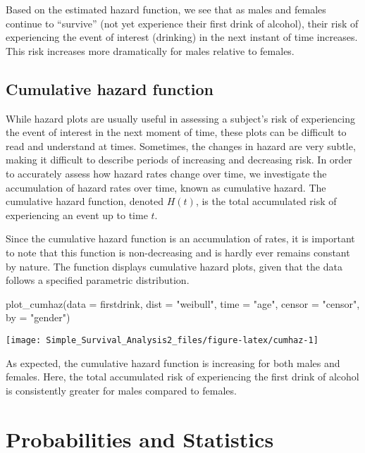 Based on the estimated hazard function, we see that as males and females
continue to ``survive'' (not yet experience their first drink of
alcohol), their risk of experiencing the event of interest (drinking) in
the next instant of time increases.\\
This risk increases more dramatically for males relative to females.

\hypertarget{cumulative-hazard-function}{%
\subsection{Cumulative hazard
function}\label{cumulative-hazard-function}}

While hazard plots are usually useful in assessing a subject's risk of
experiencing the event of interest in the next moment of time, these
plots can be difficult to read and understand at times. Sometimes, the
changes in hazard are very subtle, making it difficult to describe
periods of increasing and decreasing risk. In order to accurately assess
how hazard rates change over time, we investigate the accumulation of
hazard rates over time, known as cumulative hazard. The cumulative
hazard function, denoted \(H(t)\), is the total accumulated risk of
experiencing an event up to time \(t\).

Since the cumulative hazard function is an accumulation of rates, it is
important to note that this function is non-decreasing and is hardly
ever remains constant by nature. The  function
displays cumulative hazard plots, given that the data follows a
specified parametric distribution.

\begin{Schunk}
\begin{Sinput}
plot_cumhaz(data = firstdrink, dist = "weibull", time = "age", censor = "censor",  by = "gender")
\end{Sinput}

\texttt{[image: Simple\_Survival\_Analysis2\_files/figure-latex/cumhaz-1]} \end{Schunk}

As expected, the cumulative hazard function is increasing for both males
and females. Here, the total accumulated risk of experiencing the first
drink of alcohol is consistently greater for males compared to females.

\hypertarget{probabilities-and-statistics}{%
\section{Probabilities and
Statistics}\label{probabilities-and-statistics}}

